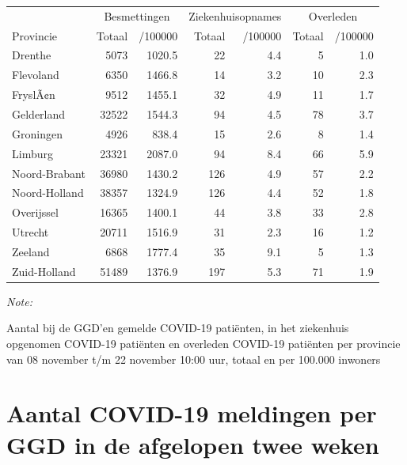 \documentclass[
  english,
  man,floatsintext]{apa6}
\begin{document}
\begin{table}
\centering
\begin{threeparttable}
\begin{tabular}{lrrrrrr}
\toprule
\multicolumn{1}{c}{ } & \multicolumn{2}{c}{Besmettingen} & \multicolumn{2}{c}{Ziekenhuisopnames} & \multicolumn{2}{c}{Overleden} \\
\cmidrule(l{3pt}r{3pt}){2-3} \cmidrule(l{3pt}r{3pt}){4-5} \cmidrule(l{3pt}r{3pt}){6-7}
Provincie & Totaal & /100000 & Totaal & /100000 & Totaal & /100000\\
\midrule
Drenthe & 5073 & 1020.5 & 22 & 4.4 & 5 & 1.0\\
Flevoland & 6350 & 1466.8 & 14 & 3.2 & 10 & 2.3\\
FryslÃ¢n & 9512 & 1455.1 & 32 & 4.9 & 11 & 1.7\\
Gelderland & 32522 & 1544.3 & 94 & 4.5 & 78 & 3.7\\
Groningen & 4926 & 838.4 & 15 & 2.6 & 8 & 1.4\\
Limburg & 23321 & 2087.0 & 94 & 8.4 & 66 & 5.9\\
Noord-Brabant & 36980 & 1430.2 & 126 & 4.9 & 57 & 2.2\\
Noord-Holland & 38357 & 1324.9 & 126 & 4.4 & 52 & 1.8\\
Overijssel & 16365 & 1400.1 & 44 & 3.8 & 33 & 2.8\\
Utrecht & 20711 & 1516.9 & 31 & 2.3 & 16 & 1.2\\
Zeeland & 6868 & 1777.4 & 35 & 9.1 & 5 & 1.3\\
Zuid-Holland & 51489 & 1376.9 & 197 & 5.3 & 71 & 1.9\\
\bottomrule
\end{tabular}
\begin{tablenotes}
\item \textit{Note: } 
\item Aantal bij de GGD’en gemelde COVID-19 patiënten, in het ziekenhuis opgenomen COVID-19 patiënten en overleden COVID-19 patiënten per provincie van 08 november t/m 22 november 10:00 uur, totaal en per 100.000 inwoners
\end{tablenotes}
\end{threeparttable}
\end{table}

\newpage

\hypertarget{aantal-covid-19-meldingen-per-ggd-in-de-afgelopen-twee-weken}{%
\section{Aantal COVID-19 meldingen per GGD in de afgelopen twee weken}\label{aantal-covid-19-meldingen-per-ggd-in-de-afgelopen-twee-weken}}
\end{document}

